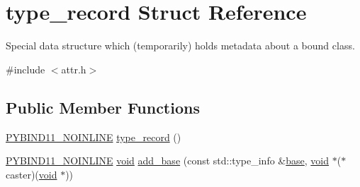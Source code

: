 \hypertarget{structtype__record}{}\section{type\+\_\+record Struct Reference}
\label{structtype__record}


Special data structure which (temporarily) holds metadata about a bound class.  




{\ttfamily \#include $<$attr.\+h$>$}

\subsection*{Public Member Functions}
\begin{DoxyCompactItemize}
\item 
\mbox{\hyperlink{detail_2common_8h_a1fb186b7494d5c576d902c0730ecbb71}{P\+Y\+B\+I\+N\+D11\+\_\+\+N\+O\+I\+N\+L\+I\+NE}} \mbox{\hyperlink{structtype__record_a2d1135673b56a24b7dd88670cd452c8b}{type\+\_\+record}} ()
\item 
\mbox{\hyperlink{detail_2common_8h_a1fb186b7494d5c576d902c0730ecbb71}{P\+Y\+B\+I\+N\+D11\+\_\+\+N\+O\+I\+N\+L\+I\+NE}} \mbox{\hyperlink{_s_d_l__opengles2__gl2ext_8h_ae5d8fa23ad07c48bb609509eae494c95}{void}} \mbox{\hyperlink{structtype__record_ae2bfc26eba5e9e9b6c7f6a22dcbff918}{add\+\_\+base}} (const std\+::type\+\_\+info \&\mbox{\hyperlink{structbase}{base}}, \mbox{\hyperlink{_s_d_l__opengles2__gl2ext_8h_ae5d8fa23ad07c48bb609509eae494c95}{void}} $\ast$($\ast$caster)(\mbox{\hyperlink{_s_d_l__opengles2__gl2ext_8h_ae5d8fa23ad07c48bb609509eae494c95}{void}} $\ast$))
\end{DoxyCompactItemize}
